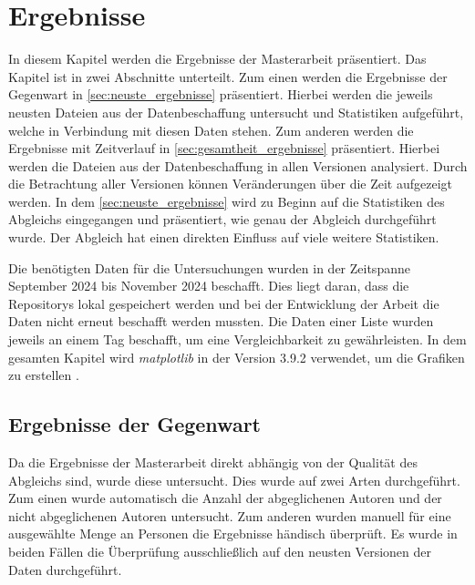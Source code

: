 \chapter{Ergebnisse}
\label{chap:ergebnisse}
In diesem Kapitel werden die Ergebnisse der Masterarbeit präsentiert.
Das Kapitel ist in zwei Abschnitte unterteilt.
Zum einen werden die Ergebnisse der Gegenwart in \autoref{sec:neuste_ergebnisse} präsentiert.
Hierbei werden die jeweils neusten Dateien aus der Datenbeschaffung untersucht und Statistiken aufgeführt, welche in Verbindung mit diesen Daten stehen.
Zum anderen werden die Ergebnisse mit Zeitverlauf in \autoref{sec:gesamtheit_ergebnisse} präsentiert.
Hierbei werden die Dateien aus der Datenbeschaffung in allen Versionen analysiert.
Durch die Betrachtung aller Versionen können Veränderungen über die Zeit aufgezeigt werden.
In dem \autoref{sec:neuste_ergebnisse} wird zu Beginn auf die Statistiken des Abgleichs eingegangen und präsentiert, wie genau der Abgleich durchgeführt wurde.
Der Abgleich hat einen direkten Einfluss auf viele weitere Statistiken.

Die benötigten Daten für die Untersuchungen wurden in der Zeitspanne September 2024 bis November 2024 beschafft.
Dies liegt daran, dass die Repositorys lokal gespeichert werden und bei der Entwicklung der Arbeit die Daten nicht erneut beschafft werden mussten.
Die Daten einer Liste wurden jeweils an einem Tag beschafft, um eine Vergleichbarkeit zu gewährleisten.
In dem gesamten Kapitel wird \emph{matplotlib} in der Version 3.9.2 verwendet, um die Grafiken zu erstellen \autocite{hunter_matplotlib_2007}.

\section{Ergebnisse der Gegenwart}
\label{sec:neuste_ergebnisse}
Da die Ergebnisse der Masterarbeit direkt abhängig von der Qualität des Abgleichs sind, wurde diese untersucht.
Dies wurde auf zwei Arten durchgeführt.
Zum einen wurde automatisch die Anzahl der abgeglichenen Autoren und der nicht abgeglichenen Autoren untersucht.
Zum anderen wurden manuell für eine ausgewählte Menge an Personen die Ergebnisse händisch überprüft.
Es wurde in beiden Fällen die Überprüfung ausschließlich auf den neusten Versionen der Daten durchgeführt.

